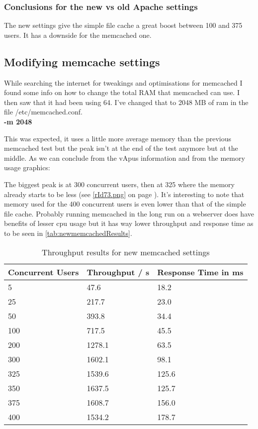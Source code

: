 \subsubsection{Conclusions for the new vs old Apache settings}
The new settings give the simple file cache a great boost between 100 and 375 users. It has a downside for the memcached one.
\subsection{Modifying memcache settings}
While searching the internet for tweakings and optimisations for memcached I found some info on how to change the total RAM that memcached can use.\cite{optimizing_memcached} I then saw that it had been using 64. I've changed that to 2048 MB of ram in the file /etc/memcached.conf. 
\\\textbf{-m 2048}

This was expected, it uses a little more average memory than the previous \gls{memcached} test but the peak isn't at the end of the test anymore but at the middle. As we can conclude from the vApus information and from the memory usage graphics:

The biggest peak is at 300 concurrent users, then at 325 where the memory already starts to be less (see \autoref{rId73.png} on page \pageref{rId73.png}). It's interesting to note that memory used for the 400 concurrent users is even lower than that of the simple file cache.
Probably running memcached in the long run on a webserver does have benefits of lesser cpu usage but it has way lower throughput and response time as to be seen in \autoref{tab:newmemcachedResults}.

\begin{table}[htb!]\begin{center}
\caption{Throughput results for new memcached settings}\label{tab:newmemcachedResults}
\begin{tabular}{|p{2.2cm}|p{2.3cm}|p{2.3cm}|}\hline\rowcolor{myLightGreen}\arrayrulecolor{myLightGreen}
 {\bf\color{white} Concurrent Users} & {\bf\color{white} Throughput / s} & {\bf\color{white} Response Time in ms} \\ \hline 
 5 & 47.6 & 18.2 \\ \hline 
 25 & 217.7 & 23.0 \\ \hline 
 50 & 393.8 & 34.4 \\ \hline 
 100 & 717.5 & 45.5 \\ \hline 
 200 & 1278.1 & 63.5 \\ \hline 
 300 & 1602.1 & 98.1 \\ \hline 
 325 & 1539.6 & 125.6 \\ \hline 
 350 & 1637.5 & 125.7 \\ \hline 
 375 & 1608.7 & 156.0 \\ \hline 
 400 & 1534.2 & 178.7 \\ \hline 
\end{tabular}\end{center}
\end{table}

